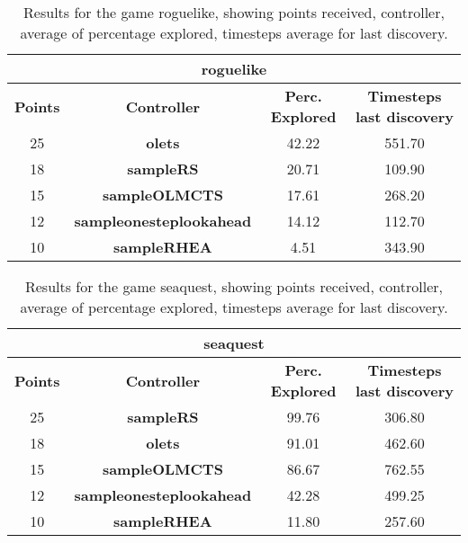 \begin{table*}[!t]
\begin{center}
\begin{tabular}{|c|c|c|c|}
\multicolumn{4}{c}{\textbf{roguelike}}\\
\hline
\textbf{Points} & \textbf{Controller} & \textbf{Perc. Explored} &  \textbf{Timesteps last discovery}\\
\hline
25 & \textbf{olets} & 42.22 & 551.70
 \\
\hline
18 & \textbf{sampleRS} & 20.71 & 109.90
 \\
\hline
15 & \textbf{sampleOLMCTS} & 17.61 & 268.20
 \\
\hline
12 & \textbf{sampleonesteplookahead} & 14.12 & 112.70
 \\
\hline
10 & \textbf{sampleRHEA} & 4.51 & 343.90
 \\
\hline
\end{tabular}
\caption{Results for the game roguelike, showing points received, controller, average of percentage explored, timesteps average for last discovery.}
\label{tab:weights}
\end{center}
\end{table*}
\begin{table*}[!t]
\begin{center}
\begin{tabular}{|c|c|c|c|}
\multicolumn{4}{c}{\textbf{seaquest}}\\
\hline
\textbf{Points} & \textbf{Controller} & \textbf{Perc. Explored} &  \textbf{Timesteps last discovery}\\
\hline
25 & \textbf{sampleRS} & 99.76 & 306.80
 \\
\hline
18 & \textbf{olets} & 91.01 & 462.60
 \\
\hline
15 & \textbf{sampleOLMCTS} & 86.67 & 762.55
 \\
\hline
12 & \textbf{sampleonesteplookahead} & 42.28 & 499.25
 \\
\hline
10 & \textbf{sampleRHEA} & 11.80 & 257.60
 \\
\hline
\end{tabular}
\caption{Results for the game seaquest, showing points received, controller, average of percentage explored, timesteps average for last discovery.}
\label{tab:weights}
\end{center}
\end{table*}
